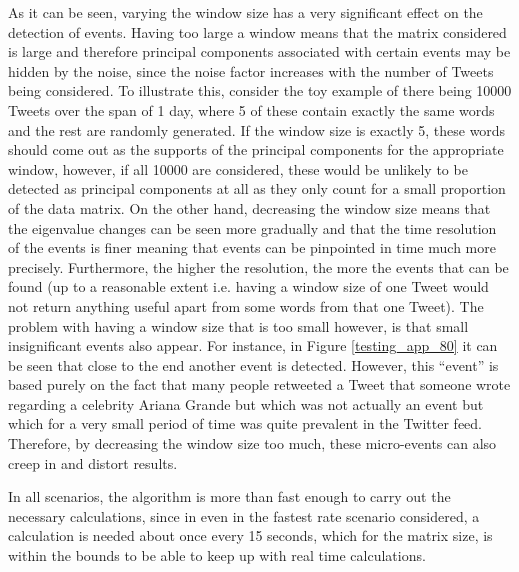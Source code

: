 \documentclass[11pt,a4paper]{article}
\begin{document}
As it can be seen, varying the window size has a very significant effect on the detection of events. Having too large a window means that the matrix considered is large and therefore principal components associated with certain events may be hidden by the noise, since the noise factor increases with the number of Tweets being considered. To illustrate this, consider the toy example of there being 10000 Tweets over the span of 1 day, where 5 of these contain exactly the same words and the rest are randomly generated. If the window size is exactly 5, these words should come out as the supports of the principal components for the appropriate window, however, if all 10000 are considered, these would be unlikely to be detected as principal components at all as they only count for a small proportion of the data matrix. On the other hand, decreasing  the window size means that the eigenvalue changes can be seen more gradually and that the time resolution of the events is finer meaning that events can be pinpointed in time much more precisely. Furthermore, the higher the resolution, the more the events that can be found (up to a reasonable extent i.e. having a window size of one Tweet would not return anything useful apart from some words from that one Tweet). The problem with having a window size that is too small however, is that small insignificant events also appear. For instance, in Figure \ref{testing_app_80} it can be seen that close to the end another event is detected. However, this ``event'' is based purely on the fact that many people retweeted a Tweet that someone wrote regarding a celebrity Ariana Grande but which was not actually an event but which for a very small period of time was quite prevalent in the Twitter feed. Therefore, by decreasing the window size too much, these micro-events can also creep in and distort results. 

In all scenarios, the algorithm is more than fast enough to carry out the necessary calculations, since in even in the fastest rate scenario considered, a calculation is needed about once every 15 seconds, which for the matrix size, is within the bounds to be able to keep up with real time calculations.
\end{document}
